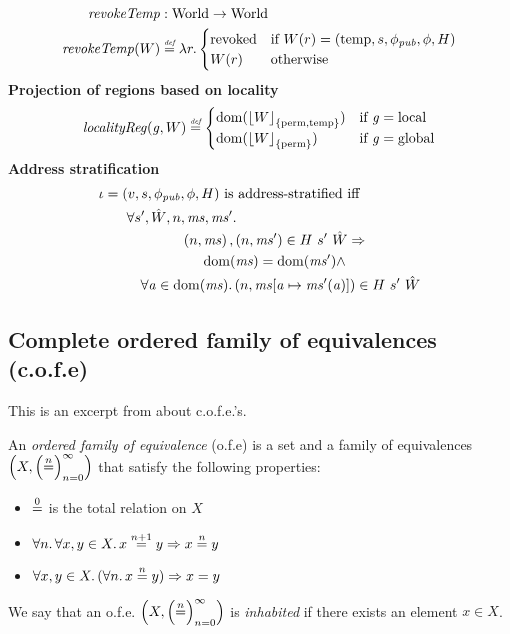 \documentclass[format=acmsmall, review=true, screen=true]{acmart}
\DeclarePairedDelimiter\floor{\lfloor}{\rfloor}
\newcommand{\update}[2]{[#1 \mapsto #2]}
\newcommand{\fun}{\rightarrow}
\newcommand{\defeq}{\stackrel{\textit{\tiny{def}}}{=}}
\newcommand{\nequal}[1][n]{\stackrel{\tiny{#1}}{=}}
\DeclareMathOperator{\dom}{dom}
\newcommand{\var}[1]{\mathit{#1}}
\newcommand{\hs}{\var{ms}}
\newcommand{\ms}{\hs}
\newcommand{\gl}{\var{g}}
\newcommand{\addr}{\var{a}}
\newcommand{\plainfun}[2]{
  \ifthenelse{\equal{#2}{}}
  {\mathit{#1}}
  {\mathit{#1}(#2)}
}
\newcommand{\revokeTemp}[1]{\plainfun{revokeTemp}{#1}}
\newcommand{\erase}[2]{\floor*{#1}_{\{#2\}}}
\newcommand{\pub}{\var{pub}}
\newcommand{\plaindom}[1]{\mathrm{#1}}
\newcommand{\Worlds}{\plaindom{World}}
\newcommand{\npair}[2][n]{\left(#1,#2 \right)}
\newcommand{\plainlocality}[1]{\mathrm{#1}}
\newcommand{\local}{\plainlocality{local}}
\newcommand{\glob}{\plainlocality{global}}
\newcommand{\localityReg}{\var{localityReg}}
\newcommand{\plainview}[1]{\mathrm{#1}}
\newcommand{\perma}{\plainview{perm}}
\newcommand{\temp}{\plainview{temp}}
\newcommand{\revoked}{\plainview{revoked}}
\begin{document}
\begin{align*}
  \revokeTemp{} & : \Worlds \fun \Worlds \\
  \revokeTemp{W} & \defeq \lambda r \ldotp 
                   \begin{cases}
                     \revoked            & \text{if }W(r) = (\temp,s,\phi_\pub,\phi,H) \\
                     W(r)                & \text{otherwise}
                   \end{cases}
\end{align*}
%
\textbf{Projection of regions based on locality}
\[
  \localityReg(\gl,W) \defeq 
  \begin{cases}
    \dom(\erase{W}{\perma ,\temp}) & \text{if } \gl = \local \\
    \dom(\erase{W}{\perma}) & \text{if } \gl = \glob
  \end{cases}
\]
%
\textbf{Address stratification}
\begin{align*}
&\iota = (v,s,\phi_\pub,\phi,H) \text{ is address-stratified iff }\\
&\qquad\begin{multlined}
  \forall s', \hat{W}, n, \ms, \ms' \ldotp \\
  \npair{\ms},\npair{\ms'} \in H~ s'~ \hat{W} \Rightarrow \\
  \dom(\ms) = \dom(\ms') \wedge \\
  \forall \addr \in
  \dom(\ms)\ldotp \npair{\ms\update{\addr}{\ms'(\addr)}} \in H~ s'~ \hat{W}
\end{multlined}
\end{align*}


\subsection{Complete ordered family of equivalences (c.o.f.e)}
\newcommand{\seq}[1]{\ensuremath{\left\{#1_n\right\}_{n=0}^{\infty}}}
\newcommand{\seqn}[1]{\ensuremath{\left(#1\right)_{n=0}^{\infty}}}
\newcommand{\NN}{\ensuremath{\mathbb{N}}}
\newcommand{\Ul}{\ensuremath{\mathcal{U}}}
\newcommand{\Later}{\ensuremath{\blacktriangleright}}
\newcommand{\op}[1]{\ensuremath{#1^{\text{op}}}}
\newcommand{\comp}{\circ}
\newcommand{\iso}{\cong}
\renewcommand{\hom}[3]{#1(#2,#3)}

\label{app:cofe}
This is an excerpt from \citet{Birkedal:tutorial-notes} about c.o.f.e.'s.
\begin{definition}[o.f.e.] An \emph{ordered family of equivalence} (o.f.e) is a
  set and a family of equivalences $\left(X, \left( \nequal \right)_{n=0}^\infty
  \right)$ that satisfy the following properties: 
  \begin{itemize}
  \item $\nequal[0]$ is the total relation on $X$
  \item $\forall n \ldotp \forall x,y \in X \ldotp x \nequal[n+1] y \Rightarrow
    x \nequal y$
  \item $\forall x,y \in X \ldotp (\forall n\ldotp x \nequal y) \Rightarrow x = y$
  \end{itemize}
  We say that an o.f.e. $\left(X, \seqn{\nequal[n]}\right)$ is \emph{inhabited} if there
  exists an element $x \in X$.
\end{definition}
\end{document}
